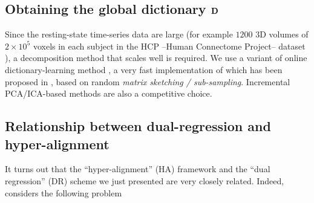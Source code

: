 \subsection{Obtaining the global dictionary $\mathbf{D}$}
Since the resting-state time-series data are large (for example $1200$ 3D volumes of
$2 \times 10^5$ voxels in each subject in the HCP --Human Connectome Project-- dataset \citep{VanEssen20122222}), a decomposition
method that scales well is required. We use a variant of online
dictionary-learning method \citep{mairal2010}, a very fast
implementation of which has been proposed in
\citep{mensch2016dictionary}, based on random \textit{matrix sketching
  / sub-sampling}.
Incremental PCA/ICA-based methods\citep{smith2014group,varoquaux2010group} are also a competitive choice.



\subsection{Relationship between dual-regression and hyper-alignment}
\label{sec:haIsDr}
It turns out that the ``hyper-alignment'' (HA) framework \citep{haxby2011} and the ``dual regression'' (DR) scheme
\citep{tavor2016task} we just presented are very closely related.
Indeed,  \citep{haxby2011} considers the following problem

